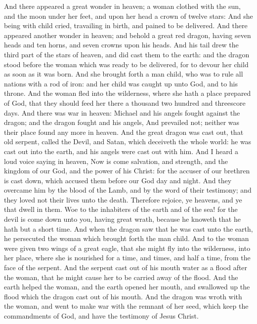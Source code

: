  And there appeared a great wonder in heaven; a woman
clothed with the sun, and the moon under her feet, and upon her head a
crown of twelve stars:  And she being with child cried,
travailing in birth, and pained to be delivered.  And
there appeared another wonder in heaven; and behold a great red dragon,
having seven heads and ten horns, and seven crowns upon his heads.
 And his tail drew the third part of the stars of heaven,
and did cast them to the earth: and the dragon stood before the woman
which was ready to be delivered, for to devour her child as soon as it
was born.  And she brought forth a man child, who was to
rule all nations with a rod of iron: and her child was caught up unto
God, and to his throne.  And the woman fled into the
wilderness, where she hath a place prepared of God, that they should
feed her there a thousand two hundred and threescore days.
 And there was war in heaven: Michael and his angels
fought against the dragon; and the dragon fought and his angels,
 And prevailed not; neither was their place found any more
in heaven.  And the great dragon was cast out, that old
serpent, called the Devil, and Satan, which deceiveth the whole world:
he was cast out into the earth, and his angels were cast out with him.
 And I heard a loud voice saying in heaven, Now is come
salvation, and strength, and the kingdom of our God, and the power of
his Christ: for the accuser of our brethren is cast down, which accused
them before our God day and night.  And they overcame him
by the blood of the Lamb, and by the word of their testimony; and they
loved not their lives unto the death.  Therefore rejoice,
ye heavens, and ye that dwell in them. Woe to the inhabiters of the
earth and of the sea! for the devil is come down unto you, having great
wrath, because he knoweth that he hath but a short time. 
And when the dragon saw that he was cast unto the earth, he persecuted
the woman which brought forth the man child.  And to the
woman were given two wings of a great eagle, that she might fly into the
wilderness, into her place, where she is nourished for a time, and
times, and half a time, from the face of the serpent. 
And the serpent cast out of his mouth water as a flood after the woman,
that he might cause her to be carried away of the flood. 
And the earth helped the woman, and the earth opened her mouth, and
swallowed up the flood which the dragon cast out of his mouth.
 And the dragon was wroth with the woman, and went to
make war with the remnant of her seed, which keep the commandments of
God, and have the testimony of Jesus Christ.

